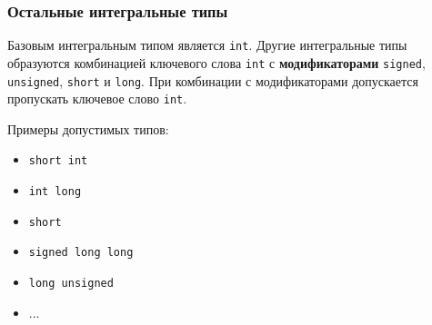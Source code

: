 \documentclass[compress, 8pt, aspectratio=169]{beamer}
\begin{document}
\begin{frame}[fragile]

    \frametitle{Остальные интегральные типы}

    Базовым интегральным типом является \verb|int|.
    Другие интегральные типы образуются комбинацией
    ключевого слова \verb|int| с \textbf{модификаторами}
    \verb|signed|, \verb|unsigned|, \verb|short| и \verb|long|.
    При комбинации с модификаторами допускается
    пропускать ключевое слово \verb|int|.

    \hfill \break
    Примеры допустимых типов:

    \begin{itemize}
        \item \verb|short int|
        \item \verb|int long|
        \item \verb|short|
        \item \verb|signed long long|
        \item \verb|long unsigned|
        \item ...
    \end{itemize}

\end{frame}
\end{document}
